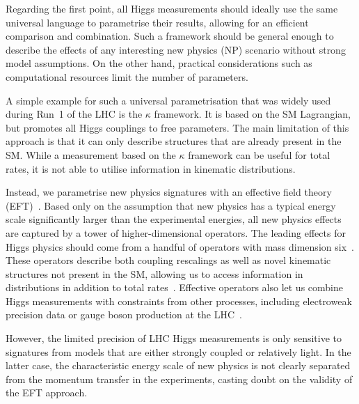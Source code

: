 \newparagraph
%
Regarding the first point, all Higgs measurements should ideally use
the same universal language to parametrise their results, allowing for
an efficient comparison and combination. Such a framework should be
general enough to describe the effects of any interesting new physics
(NP) scenario without strong model assumptions.  On the other hand,
practical considerations such as computational resources limit the
number of parameters.
%

A simple example for such a universal parametrisation that was widely
used during Run~1 of the LHC is the $\kappa$ framework. It is based on
the SM Lagrangian, but promotes all Higgs couplings to free
parameters. The main limitation of this approach is that it can only
describe structures that are already present in the SM. While a
measurement based on the $\kappa$ framework can be useful for total
rates, it is not able to utilise information in kinematic
distributions.

Instead, we parametrise new physics signatures with an effective field
theory (EFT)~\cite{Coleman:1969sm, Callan:1969sn,
  Weinberg:1980wa}. Based only on the assumption that new physics has
a typical energy scale significantly larger than the experimental
energies, all new physics effects are captured by a tower of
higher-dimensional operators. The leading effects for Higgs physics
should come from a handful of operators with mass dimension
six~\cite{Burges:1983zg, Leung:1984ni, Buchmuller:1985jz}. These
operators
%
%
describe both coupling rescalings as well as novel kinematic
structures not present in the SM, allowing us to access information in
distributions in addition to total rates~\cite{Corbett:2012ja,
  Corbett:2015ksa}. Effective operators also let us combine Higgs
measurements with constraints from other processes, including
electroweak precision data or gauge boson production at the
LHC~\cite{Butter:2016cvz}.

However, the limited precision of LHC Higgs measurements is only
sensitive to signatures from models that are either strongly coupled
or relatively light. In the latter case, the characteristic energy
scale of new physics is not clearly separated from the momentum
transfer in the experiments, casting doubt on the validity of the EFT
approach.


